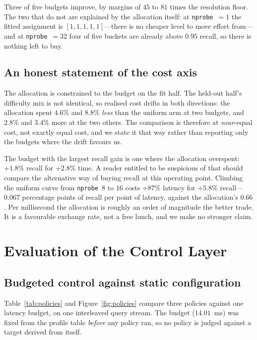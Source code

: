 \documentclass[conference]{IEEEtran}
\begin{document}
Three of five budgets improve, by margins of $45$ to $81$ times the resolution
floor. The two that do not are explained by the allocation itself: at
\texttt{nprobe}~$=1$ the fitted assignment is $[1,1,1,1,1]$---there is no
cheaper level to move effort from---and at \texttt{nprobe}~$=32$ four of five
buckets are already above $0.95$ recall, so there is nothing left to buy.

\subsection{An honest statement of the cost axis}

The allocation is constrained to the budget on the fit half. The held-out half's
difficulty mix is not identical, so realised cost drifts in both directions: the
allocation spent $4.6\%$ and $8.8\%$ \emph{less} than the uniform arm at two
budgets, and $2.8\%$ and $3.4\%$ more at the two others. The comparison is
therefore at \emph{near}-equal cost, not exactly equal cost, and we state it
that way rather than reporting only the budgets where the drift favours us.

The budget with the largest recall gain is one where the allocation overspent:
$+1.8\%$ recall for $+2.8\%$ time. A reader entitled to be suspicious of that
should compare the alternative way of buying recall at this operating point.
Climbing the uniform curve from \texttt{nprobe}~$8$ to $16$ costs $+87\%$
latency for $+5.8\%$ recall---$0.067$ percentage points of recall per point of
latency, against the allocation's $0.66$. Per millisecond the allocation is
roughly an order of magnitude the better trade. It is a favourable exchange
rate, not a free lunch, and we make no stronger claim.

\section{Evaluation of the Control Layer}

\subsection{Budgeted control against static configuration}
\label{sec:policies}

Table~\ref{tab:policies} and Figure~\ref{fig:policies} compare three policies
against one latency budget, on one interleaved query stream. The budget
($14.01$~ms) was fixed from the profile table \emph{before} any policy ran, so
no policy is judged against a target derived from itself.
\end{document}
